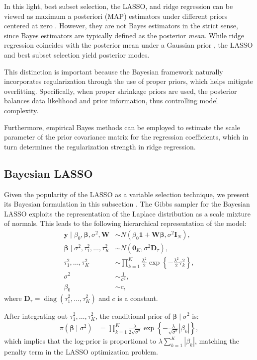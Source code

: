 In this light, best subset selection, the LASSO, and ridge regression can be viewed as maximum a posteriori (MAP) estimators under different priors centered at zero \cite{Park2008}. However, they are not Bayes estimators in the strict sense, since Bayes estimators are typically defined as the posterior \textit{mean}. While ridge regression coincides with the posterior mean under a Gaussian prior \cite{Ishwaran2005}, the LASSO and best subset selection yield posterior modes.

This distinction is important because the Bayesian framework naturally incorporates regularization through the use of proper priors, which helps mitigate overfitting. Specifically, when proper shrinkage priors are used, the posterior balances data likelihood and prior information, thus controlling model complexity.

Furthermore, empirical Bayes methods can be employed to estimate the scale parameter of the prior covariance matrix for the regression coefficients, which in turn determines the regularization strength in ridge regression.

\subsection{Bayesian LASSO}\label{sec13_21}
Given the popularity of the LASSO as a variable selection technique, we present its Bayesian formulation in this subsection \cite{Park2008}. The Gibbs sampler for the Bayesian LASSO exploits the representation of the Laplace distribution as a scale mixture of normals. This leads to the following hierarchical representation of the model:
\begin{align*}
	\mathbf{y} \mid \beta_0, \boldsymbol{\beta}, \sigma^2, \mathbf{W} &\sim {N}(\beta_0 \mathbf{1} + \mathbf{W} \boldsymbol{\beta}, \sigma^2 \mathbf{I}_N), \\
	\boldsymbol{\beta} \mid \sigma^2, \tau_1^2, \dots, \tau_K^2 &\sim {N}(\mathbf{0}_K, \sigma^2 \mathbf{D}_{\tau}), \\
	\tau_1^2, \dots, \tau_K^2 &\sim \prod_{k=1}^K \frac{\lambda^2}{2} \exp\left\{ -\frac{\lambda^2}{2} \tau_k^2 \right\}, \\
	\sigma^2 &\sim \frac{1}{\sigma^2},\\
	\beta_0&\sim c,
\end{align*}
where $\mathbf{D}_{\tau} = \operatorname{diag}(\tau_1^2, \dots, \tau_K^2)$ and $c$ is a constant. 

After integrating out \( \tau_1^2, \dots, \tau_K^2 \), the conditional prior of \( \boldsymbol{\beta} \mid \sigma^2 \) is:
\begin{align*}
	\pi(\boldsymbol{\beta} \mid \sigma^2) &= \prod_{k=1}^K \frac{\lambda}{2 \sqrt{\sigma^2}} \exp\left\{ -\frac{\lambda}{\sqrt{\sigma^2}} |\beta_k| \right\},
\end{align*}
which implies that the log-prior is proportional to \( \lambda \sum_{k=1}^K |\beta_k| \), matching the penalty term in the LASSO optimization problem.

